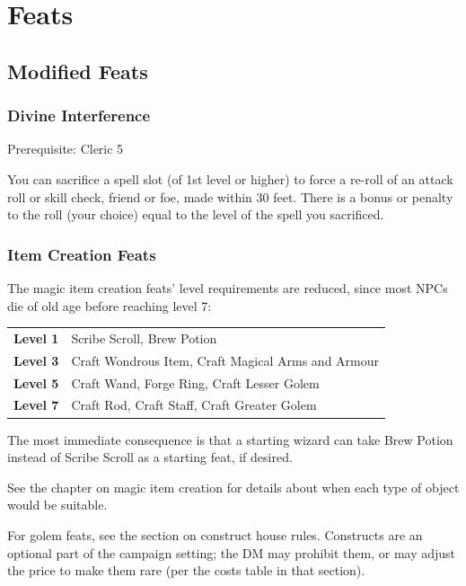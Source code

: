 
\chapter{Feats}
\label{sect-feats}

\section{Modified Feats}

%
\subsection{Divine Interference}

Prerequisite: Cleric 5

You can sacrifice a spell slot (of 1st level or higher) to force a re-roll
of an attack roll or skill check, friend or foe, made within 30 feet. There
is a bonus or penalty to the roll (your choice) equal to the level of the
spell you sacrificed.
%

%
\subsection{Item Creation Feats}

The magic item creation feats' level requirements are reduced, since most
NPCs die of old age before reaching level 7:

\begin{tabular}{l|l}\hline
\textbf{Level 1} & Scribe Scroll, Brew Potion \\
\textbf{Level 3} & Craft Wondrous Item, Craft Magical Arms and Armour \\
\textbf{Level 5} & Craft Wand, Forge Ring, Craft Lesser Golem \\
\textbf{Level 7} & Craft Rod, Craft Staff, Craft Greater Golem \\
\hline
\end{tabular}

The most immediate consequence is that a starting wizard can take Brew
Potion instead of Scribe Scroll as a starting feat, if desired.

See the chapter on magic item creation for details about when each type
of object would be suitable.

For golem feats, see the section on construct house rules. Constructs are
an optional part of the campaign setting; the DM may prohibit them, or may
adjust the price to make them rare (per the costs table in that section).
%

